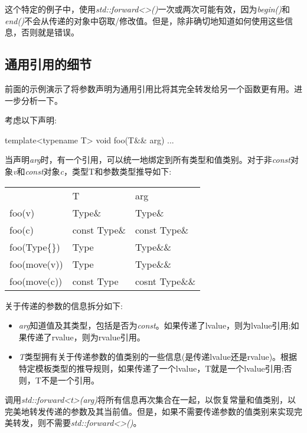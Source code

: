 这个特定的例子中，使用\textit{std::forward<>()}一次或两次可能有效，因为\textit{begin()}和\textit{end()}不会从传递的对象中窃取/修改值。但是，除非确切地知道如何使用这些信息，否则就是错误。

\subsection{通用引用的细节}

前面的示例演示了将参数声明为通用引用比将其完全转发给另一个函数更有用。进一步分析一下。

考虑以下声明:

\begin{cppcode}
template<typename T>
void foo(T&& arg) {
	...
}
\end{cppcode}

当声明\textit{arg}时，有一个引用，可以统一地绑定到所有类型和值类别。对于非\textit{const}对象\textit{v}和\textit{const}对象\textit{c}，类型T和参数类型推导如下:

\begin{table}[H]
	\begin{tabular}{lll}
		& T            & arg            \\
		foo(v)        & Type\&       & Type\&         \\
		foo(c)        & const Type\& & const Type\&   \\
		foo(Type\{\}) & Type         & Type\&\&       \\
		foo(move(v))  & Type         & Type\&\&       \\
		foo(move(c))  & const Type   & cosnt Type\&\&
	\end{tabular}
\end{table}

关于传递的参数的信息拆分如下:

\begin{itemize}
	\item \textit{arg}知道值及其类型，包括是否为\textit{const}。如果传递了lvalue，则为lvalue引用;如果传递了rvalue，则为rvalue引用。
	\item \textit{T}类型拥有关于传递参数的值类别的一些信息(是传递lvalue还是rvalue)。根据特定模板类型的推导规则，如果传递了一个lvalue，T就是一个lvalue引用;否则，T不是一个引用。
\end{itemize}

调用\textit{std::forward<t>(arg)}将所有信息再次集合在一起，以恢复常量和值类别，以完美地转发传递的参数及其当前值。但是，如果不需要传递参数的值类别来实现完美转发，则不需要\textit{std::forward<>()}。

